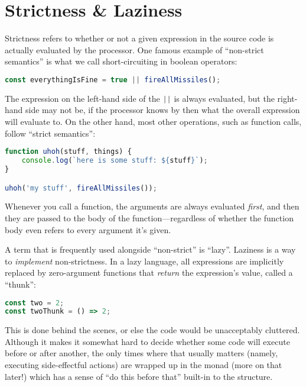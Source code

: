 \section{Strictness \& Laziness}

Strictness refers to whether or not a given expression in the source code is actually evaluated by the processor. One famous example of ``non-strict semantics'' is what we call short-circuiting in boolean operators:

\begin{lstlisting}[language=js]
const everythingIsFine = true || fireAllMissiles();
\end{lstlisting}

The expression on the left-hand side of the \lstinline[language=js]!||! is always evaluated, but the right-hand side may not be, if the processor knows by then what the overall expression will evaluate to. On the other hand, most other operations, such as function calls, follow ``strict semantics'':

\begin{lstlisting}[language=js]
function uhoh(stuff, things) {
    console.log(`here is some stuff: ${stuff}`);
}

uhoh('my stuff', fireAllMissiles());
\end{lstlisting}

Whenever you call a function, the arguments are always evaluated \emph{first}, and then they are passed to the body of the function---regardless of whether the function body even refers to every argument it's given.

A term that is frequently used alongside ``non-strict'' is ``lazy''. Laziness is a way to \emph{implement} non-strictness. In a lazy language, all expressions are implicitly replaced by zero-argument functions that \emph{return} the expression's value, called a ``thunk'':

\begin{lstlisting}[language=js]
const two = 2;
const twoThunk = () => 2;
\end{lstlisting}

This is done behind the scenes, or else the code would be unacceptably cluttered. Although it makes it somewhat hard to decide whether some code will execute before or after another, the only times where that usually matters (namely, executing side-effectful actions) are wrapped up in the  monad (more on that later!) which has a sense of ``do this before that'' built-in to the structure.

